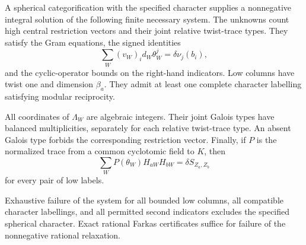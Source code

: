 \begin{theorem}\label{thm:signed-traces}
A spherical categorification with the specified character supplies a
nonnegative integral solution of the following finite necessary system.
The unknowns count high central restriction vectors and their joint
relative twist-trace types. They satisfy the Gram equations, the signed
identities
\begin{equation}\label{eq:signed-indicators}
 \sum_W(v_W)_i d_W\theta_W^j=\delta\nu_j(b_i),
\end{equation}
and the cyclic-operator bounds on the right-hand indicators. Low
columns have twist one and dimension $\beta_a$. They admit at least
one complete character labelling satisfying modular reciprocity.

All coordinates of $\Lambda_W$ are algebraic integers. Their joint
Galois types have balanced multiplicities, separately for each relative
twist-trace type. An absent Galois type forbids the corresponding
restriction vector. Finally, if $P$ is the normalized trace from a
common cyclotomic field to $K$, then
\begin{equation}\label{eq:signed-low-modular}
 \sum_W P(\theta_W)H_{aW}H_{bW}=\delta S_{Z_a,Z_b}
\end{equation}
for every pair of low labels.

Exhaustive failure of the system for all bounded low columns, all
compatible character labellings, and all permitted second indicators
excludes the specified spherical character. Exact rational Farkas
certificates suffice for failure of the nonnegative rational relaxation.
\end{theorem}
